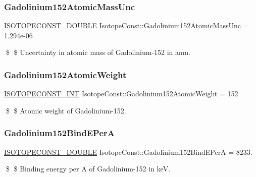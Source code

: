 \subsubsection{\texorpdfstring{Gadolinium152\+Atomic\+Mass\+Unc}{Gadolinium152AtomicMassUnc}}
{\footnotesize\ttfamily \mbox{\hyperlink{group___isotope_const-_macros_ga8f45a7272ce02c0b4c65c44636ed719a}{I\+S\+O\+T\+O\+P\+E\+C\+O\+N\+S\+T\+\_\+\+D\+O\+U\+B\+LE}} Isotope\+Const\+::\+Gadolinium152\+Atomic\+Mass\+Unc = 1.\+294e-\/06}

\$ \$ Uncertainty in atomic mass of Gadolinium-\/152 in amu. \mbox{\label{group___isotope_const-_gadolinium-_gd152_ga2aafc00486887b64eae83e56dd6a4893}} 
\subsubsection{\texorpdfstring{Gadolinium152\+Atomic\+Weight}{Gadolinium152AtomicWeight}}
{\footnotesize\ttfamily \mbox{\hyperlink{group___isotope_const-_macros_ga5f18360b3e99483a35c32d789e62621c}{I\+S\+O\+T\+O\+P\+E\+C\+O\+N\+S\+T\+\_\+\+I\+NT}} Isotope\+Const\+::\+Gadolinium152\+Atomic\+Weight = 152}

\$ \$ Atomic weight of Gadolinium-\/152. \mbox{\label{group___isotope_const-_gadolinium-_gd152_gae005b865f78eb1514aae42f5742a11f9}} 
\subsubsection{\texorpdfstring{Gadolinium152\+Bind\+E\+PerA}{Gadolinium152BindEPerA}}
{\footnotesize\ttfamily \mbox{\hyperlink{group___isotope_const-_macros_ga8f45a7272ce02c0b4c65c44636ed719a}{I\+S\+O\+T\+O\+P\+E\+C\+O\+N\+S\+T\+\_\+\+D\+O\+U\+B\+LE}} Isotope\+Const\+::\+Gadolinium152\+Bind\+E\+PerA = 8233.}

\$ \$ Binding energy per A of Gadolinium-\/152 in keV. \mbox{\label{group___isotope_const-_gadolinium-_gd152_ga33c190507a6ab03dbfaf869115925896}} 
